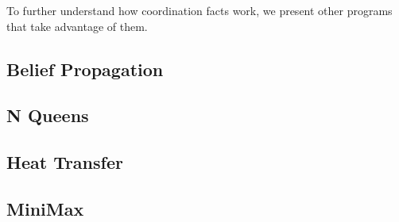 To further understand how coordination facts work, we present other programs that
take advantage of them.

\subsection{Belief Propagation}\label{sec:coordination:bp}


\clearpage
\subsection{N Queens}\label{section:coord:nqueens}


\subsection{Heat Transfer}\label{section:coord:ht}

\subsection{MiniMax}\label{section:coord:minimax}

